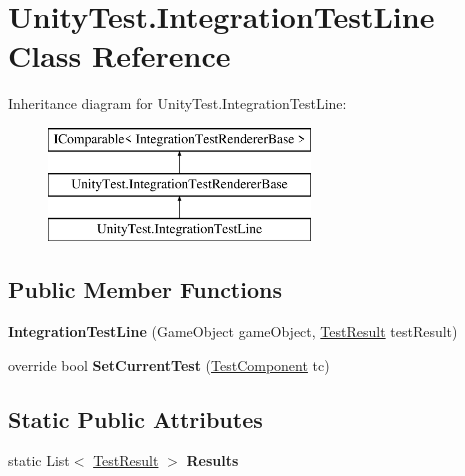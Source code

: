 \hypertarget{class_unity_test_1_1_integration_test_line}{}\section{Unity\+Test.\+Integration\+Test\+Line Class Reference}
\label{class_unity_test_1_1_integration_test_line}
Inheritance diagram for Unity\+Test.\+Integration\+Test\+Line\+:\begin{figure}[H]
\begin{center}
\leavevmode
\includegraphics[height=3.000000cm]{class_unity_test_1_1_integration_test_line}
\end{center}
\end{figure}
\subsection*{Public Member Functions}
\begin{DoxyCompactItemize}
\item 
\mbox{\label{class_unity_test_1_1_integration_test_line_a3f95821280d4c22ed38855f3448cbb40}} 
{\bfseries Integration\+Test\+Line} (Game\+Object game\+Object, \hyperlink{class_unity_test_1_1_test_result}{Test\+Result} test\+Result)
\item 
\mbox{\label{class_unity_test_1_1_integration_test_line_aec2c7b449f78c5fceb0f5f19c53d2149}} 
override bool {\bfseries Set\+Current\+Test} (\hyperlink{class_unity_test_1_1_test_component}{Test\+Component} tc)
\end{DoxyCompactItemize}
\subsection*{Static Public Attributes}
\begin{DoxyCompactItemize}
\item 
\mbox{\label{class_unity_test_1_1_integration_test_line_af1b1d7e6bd6a988f924013523c0bcc26}} 
static List$<$ \hyperlink{class_unity_test_1_1_test_result}{Test\+Result} $>$ {\bfseries Results}
\end{DoxyCompactItemize}
